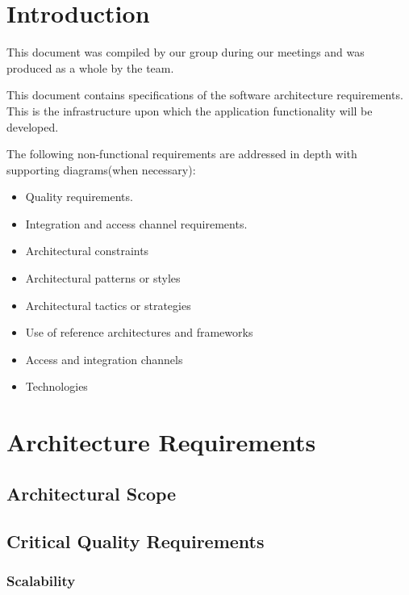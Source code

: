 \documentclass[a4paper,12pt,titlepage]{article}
\begin{document}



\newpage
\tableofcontents


\section{Introduction}

This document was compiled by our group during our meetings and was produced as a whole by the team. \bigskip

This document contains specifications of the software architecture requirements. This is the infrastructure upon which the application functionality will be developed. \bigskip

The following non-functional requirements are addressed in depth with supporting diagrams(when necessary):

\begin{itemize}
	\item Quality requirements.
	\item Integration and access channel requirements.
	\item Architectural constraints
	\item Architectural patterns or styles
	\item Architectural tactics or strategies
	\item Use of reference architectures and frameworks
	\item Access and integration channels
	\item Technologies
\end{itemize}

\newpage

\section{Architecture Requirements}
\subsection{Architectural Scope} %

\newpage
\subsection{Critical Quality Requirements}
\subsubsection{Scalability}%
	
\newpage
\end{document}
